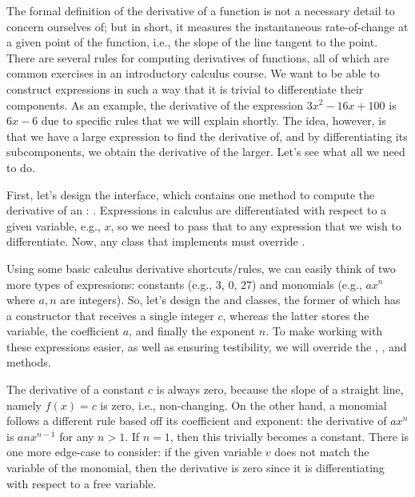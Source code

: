 The formal definition of the derivative of a function is not a necessary detail to concern ourselves of; but in short, it measures the instantaneous rate-of-change at a given point of the function, i.e., the slope of the line tangent to the point. There are several rules for computing derivatives of functions, all of which are common exercises in an introductory calculus course. We want to be able to construct expressions in such a way that it is trivial to differentiate their components. As an example, the derivative of the expression $3x^2 - 16x + 100$ is $6x - 6$ due to specific rules that we will explain shortly. The idea, however, is that we have a large expression to find the derivative of, and by differentiating its subcomponents, we obtain the derivative of the larger. Let's see what all we need to do.

First, let's design the  interface, which contains one method to compute the derivative of an : . Expressions in calculus are differentiated with respect to a given variable, e.g., $x$, so we need to pass that to any expression that we wish to differentiate. Now, any class that implements  must override . 

Using some basic calculus derivative shortcuts/rules, we can easily think of two more types of expressions: constants (e.g., $3$, $0$, $27$) and monomials (e.g., $ax^n$ where $a, n$ are integers). So, let's design the  and  classes, the former of which has a constructor that receives a single integer $c$, whereas the latter stores the variable, the coefficient $a$, and finally the exponent $n$. To make working with these expressions easier, as well as ensuring testibility, we will override the , , and  methods.

The derivative of a constant $c$ is always zero, because the slope of a straight line, namely $f(x) = c$ is zero, i.e., non-changing. On the other hand, a monomial follows a different rule based off its coefficient and exponent: the derivative of $ax^n$ is $anx^{n-1}$ for any $n > 1$. If $n=1$, then this trivially becomes a constant. There is one more edge-case to consider: if the given variable $v$ does not match the variable of the monomial, then the derivative is zero since it is differentiating with respect to a free variable. 


